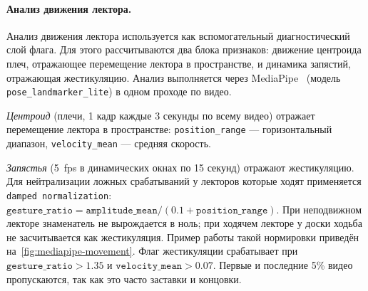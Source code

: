 \paragraph{Анализ движения лектора.}

Анализ движения лектора используется как вспомогательный диагностический слой флага.
Для этого рассчитываются два блока признаков: движение центроида плеч, отражающее перемещение лектора в пространстве,
и динамика запястий, отражающая жестикуляцию.
Анализ выполняется через MediaPipe~\cite{lugaresi2019mediapipe}
(модель \texttt{pose\_landmarker\_lite}) в одном проходе по видео.

\textit{Центроид} (плечи, 1 кадр каждые 3 секунды по всему видео)
отражает перемещение лектора в пространстве:
\texttt{position\_range} — горизонтальный диапазон,
\texttt{velocity\_mean} — средняя скорость.

\textit{Запястья} (5~fps в динамических окнах по 15 секунд)
отражают жестикуляцию.
Для нейтрализации ложных срабатываний у лекторов которые ходят
применяется \texttt{damped normalization}:
$\texttt{gesture\_ratio} = \texttt{amplitude\_mean} / (0.1 + \texttt{position\_range})$.
При неподвижном лекторе знаменатель не вырождается в ноль;
при ходячем лекторе у доски ходьба не засчитывается как жестикуляция.
Пример работы такой нормировки приведён на~\cref{fig:mediapipe-movement}.
Флаг жестикуляции срабатывает при
$\texttt{gesture\_ratio} > 1.35$ и $\texttt{velocity\_mean} > 0.07$.
Первые и последние 5\% видео пропускаются, так как это часто заставки и концовки.

